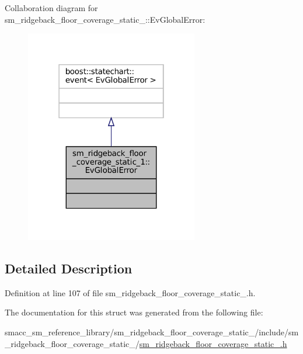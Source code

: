 Collaboration diagram for sm\+\_\+ridgeback\+\_\+floor\+\_\+coverage\+\_\+static\+\_\+:\+:Ev\+Global\+Error\+:
\nopagebreak
\begin{figure}[H]
\begin{center}
\leavevmode
\includegraphics[width=214pt]{structsm__ridgeback__floor__coverage__static__1_1_1EvGlobalError__coll__graph}
\end{center}
\end{figure}


\subsection{Detailed Description}


Definition at line 107 of file sm\+\_\+ridgeback\+\_\+floor\+\_\+coverage\+\_\+static\+\_.\+h.



The documentation for this struct was generated from the following file\+:\begin{DoxyCompactItemize}
\item 
smacc\+\_\+sm\+\_\+reference\+\_\+library/sm\+\_\+ridgeback\+\_\+floor\+\_\+coverage\+\_\+static\+\_/include/sm\+\_\+ridgeback\+\_\+floor\+\_\+coverage\+\_\+static\+\_/\hyperlink{sm__ridgeback__floor__coverage__static__1_8h}{sm\+\_\+ridgeback\+\_\+floor\+\_\+coverage\+\_\+static\+\_.\+h}\end{DoxyCompactItemize}
